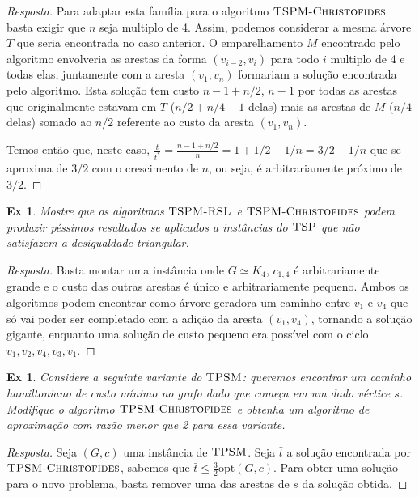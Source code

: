 \documentclass[12pt]{article}
\newcounter{exCounter}
\newtheorem{ex}[exCounter]{Ex}
\begin{document}
\begin{proof}[Resposta]
Para adaptar esta família para o algoritmo $\textsc{TSPM-Christofides}$ basta exigir que $n$ seja multiplo de 4. Assim, podemos considerar a mesma árvore $T$ que seria encontrada no caso anterior. O emparelhamento $M$ encontrado pelo algoritmo envolveria as arestas da forma $(v_{i-2}, v_{i})$ para todo $i$ multiplo de 4 e todas elas, juntamente com a aresta $(v_1,v_n)$ formariam a solução encontrada pelo algoritmo. Esta solução tem custo $n-1+n/2$, $n-1$ por todas as arestas que originalmente estavam em $T$ ($n/2+n/4-1$ delas) mais as arestas de $M$ ($n/4$ delas) somado ao $n/2$ referente ao custo da aresta $(v_1,v_n)$.  

Temos então que, neste caso, $\frac{\bar{t}}{t^*} = \frac{n-1+n/2}{n} = 1 + 1/2 - 1/n = 3/2 - 1/n$ que se aproxima de $3/2$ com o crescimento de $n$, ou seja, é arbitrariamente próximo de $3/2$.
\end{proof}

\begin{ex}
Mostre que os algoritmos $\textsc{TSPM-RSL}$ e $\textsc{TSPM-Christofides}$ podem produzir péssimos resultados se aplicados a instâncias do $\textsc{TSP}$ que não satisfazem a desigualdade triangular.
\end{ex}

\begin{proof}[Resposta]
Basta montar uma instância onde $G \simeq K_4$, $c_{1,4}$ é arbitrariamente grande e o custo das outras arestas é único e arbitrariamente pequeno. Ambos os algoritmos podem encontrar como árvore geradora um caminho entre $v_1$ e $v_4$ que só vai poder ser completado com a adição da aresta $(v_1,v_4)$, tornando a solução gigante, enquanto uma solução de custo pequeno era possível com o ciclo $v_1, v_2, v_4, v_3, v_1$.
\end{proof}

\begin{ex}
Considere a seguinte variante do $\textsc{TPSM}$: queremos encontrar um caminho hamiltoniano de custo mínimo no grafo dado que começa em um dado vértice $s$. Modifique o algoritmo $\textsc{TPSM-Christofides}$ e obtenha um algoritmo de aproximação com razão menor que 2 para essa variante.
\end{ex}

\begin{proof}[Resposta]
Seja $(G,c)$ uma instância de $\textsc{TPSM}$. Seja $\bar{t}$ a solução encontrada por $\textsc{TPSM-Christofides}$, sabemos que $\bar{t} \leq \frac{3}{2}\textrm{opt}(G,c)$. Para obter uma solução para o novo problema, basta remover uma das arestas de $s$ da solução obtida.
\end{proof}
\end{document}
